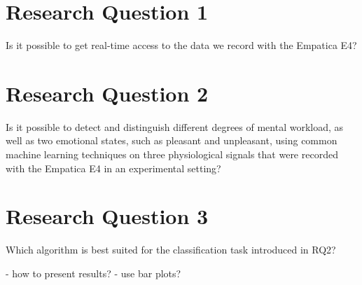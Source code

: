 

\section{Research Question 1} 
Is it possible to get real-time access to the data we record with the Empatica E4?
\section{Research Question 2}  
Is it possible to detect and distinguish different degrees of mental workload, as well as two emotional states, such as pleasant and unpleasant, using common machine learning techniques on three physiological signals that were recorded with the Empatica E4 in an experimental setting?
\section{Research Question 3}  
Which algorithm is best suited for the classification task introduced in RQ2?




- how to present results?
- use bar plots?